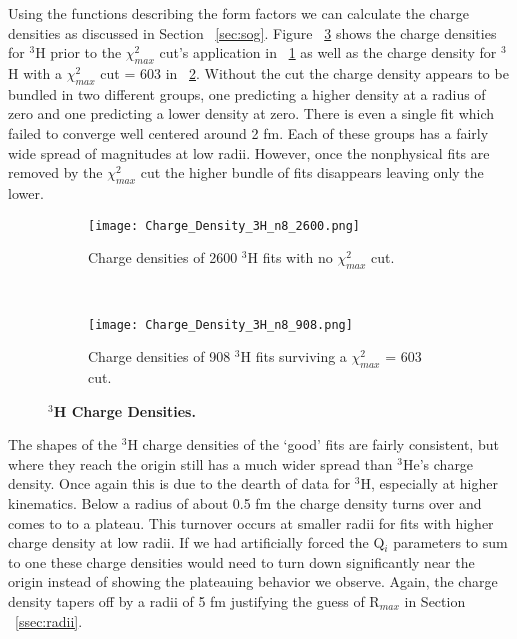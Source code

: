 Using the functions describing the form factors we can calculate the charge densities as discussed in Section ~\ref{sec:sog}. Figure ~\ref{fig:3h_charge_density} shows the charge densities for $^3$H prior to the $\chi^2_{max}$ cut's application in ~\ref{fig:3h_charge_density_no_cut} as well as the charge density for $^3$H with a $\chi^2_{max}$ cut = 603 in ~\ref{fig:3h_charge_density_cut}. Without the cut the charge density appears to be bundled in two different groups, one predicting a higher density at a radius of zero and one predicting a lower density at zero. There is even a single fit which failed to converge well centered around 2 fm. Each of these groups has a fairly wide spread of magnitudes at low radii. However, once the nonphysical fits are removed by the $\chi^2_{max}$ cut the higher bundle of fits disappears leaving only the lower. 

\begin{figure}[!ht]
\begin{subfigure}{1.\textwidth}
  \centering
  \texttt{[image: Charge\_Density\_3H\_n8\_2600.png]}
  \caption{Charge densities of 2600 $^3$H fits with no $\chi^2_{max}$ cut.}
  \label{fig:3h_charge_density_no_cut}
\end{subfigure}\\
\begin{subfigure}{1.\textwidth}
  \centering
  \texttt{[image: Charge\_Density\_3H\_n8\_908.png]}
  \caption{Charge densities of 908 $^3$H fits surviving a $\chi^2_{max}$ = 603 cut.}
  \label{fig:3h_charge_density_cut}
\end{subfigure}
\caption{\bf{$^3$H Charge Densities.}}
\label{fig:3h_charge_density}
\end{figure}

The shapes of the $^3$H charge densities of the `good' fits are fairly consistent, but where they reach the origin still has a much wider spread than $^3$He's charge density. Once again this is due to the dearth of data for $^3$H, especially at higher kinematics. Below a radius of about 0.5 fm the charge density turns over and comes to to a plateau. This turnover occurs at smaller radii for fits with higher charge density at low radii. If we had artificially forced the Q$_i$ parameters to sum to one these charge densities would need to turn down significantly near the origin instead of showing the plateauing behavior we observe. Again, the charge density tapers off by a radii of 5 fm justifying the guess of R$_{max}$ in Section ~\ref{ssec:radii}.

